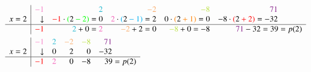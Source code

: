\documentclass[10pt,a4paper]{article}
\begin{document}
\begin{align*}
&\begin{array}[htbp]{c|rrrrr}
	      & {\color{Lavender}-1} & {\color{Turquoise}2}                                        & {\color{Apricot}-2}                                                   & {\color{SpringGreen}-8}                      & {\color{Fuchsia}71} \qquad \quad \\
	x = 2 & \downarrow           & {\color{red}-1}\cdot{\color{green}({\color{black}2}-2)} = 0 & {\color{CarnationPink}2} \cdot {\color{cyan}({\color{black}2}-1)} = 2 & 0 \cdot {\color{orange}({\color{black}2}+1)} = 0 & -8 \cdot {\color{red}({\color{black}2}+2)} = -32 \qquad \quad \\ \hline
	      & {\color{red}-1}      & {\color{Turquoise}2}+0={\color{CarnationPink}2}             & {\color{Apricot}-2}+ 2 = 0                                            & {\color{SpringGreen}-8} + 0 = -8                                          & {\color{Fuchsia}71}-32 = 39 = p(2)
\end{array} \\
&\begin{array}[htbp]{c|rrrrr}
	      & {\color{Lavender}-1} & {\color{Turquoise}2}     & {\color{Apricot}-2} & {\color{SpringGreen}-8} & {\color{Fuchsia}71} \qquad \quad \\
	x = 2 & \downarrow           & 0                        & 2                   & 0                       & -32 \qquad \quad                 \\ \hline
	      & {\color{red}-1}      & {\color{CarnationPink}2} & 0                   & -8                      & 39 = p(2)
\end{array}
\end{align*}
\end{document}
